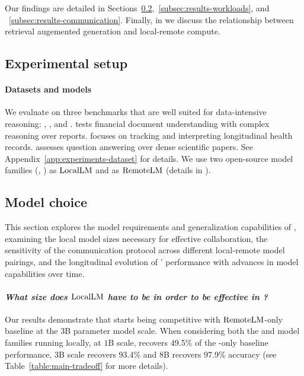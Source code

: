 Our findings are detailed in Sections~\ref{subsec:results-model},~\ref{subsec:results-workloads}, and ~\ref{subsec:results-communication}. Finally, in  we discuss the relationship between retrieval augemented generation and local-remote compute. 

\vspace{-0.5em}
\subsection{Experimental setup} 
\label{subsec:exp-setup}
\paragraph{Datasets and models} We evaluate \system on three benchmarks that are well suited for data-intensive reasoning: \finance, \longhealth, and \qasper. \finance tests financial document understanding with complex reasoning over reports. \longhealth focuses on tracking and interpreting longitudinal health records. \qasper assesses question answering over dense scientific papers. See Appendix~\ref{app:experiments-dataset} for details. We use two open-source model families (\llama, \qwen) as $\mathrm{LocalLM}$ and \gpt as $\mathrm{RemoteLM}$ (details in ).

\vspace{-0.5em}\subsection{Model choice}
\label{subsec:results-model}

This section explores the model requirements and generalization capabilities of \system, examining the local model sizes necessary for effective collaboration, the sensitivity of the communication protocol across different local-remote model pairings, and the longitudinal evolution of \system’ performance with advances in model capabilities over time.

\vspace{-0.5em}\paragraph{\textit{What size does $\mathrm{LocalLM}$ have to be in order to be effective in \system?}}

Our results demonstrate that \system starts being competitive with $\mathrm{RemoteLM}$-only baseline at the $3$B parameter model scale. When considering both the \qwen and \llama model families running locally, at $1$B scale, \system recovers 49.5\% of the \gpt-only baseline performance, 3B scale recovers 93.4\% and 8B recovers 97.9\% accuracy (see Table~\ref{table:main-tradeoff} for more details).

